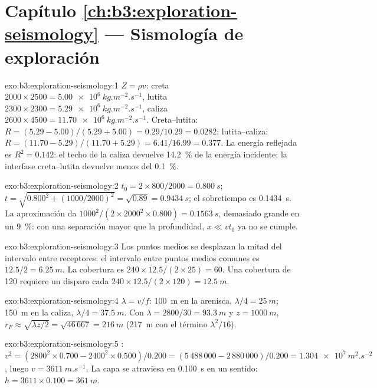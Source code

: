 \section*{Capítulo \ref{ch:b3:exploration-seismology} --- Sismología de exploración}

\begin{solution}{exo:b3:exploration-seismology:1}
$Z = \rho v$: creta $2000\times2500 = \qty{5.00e6}{kg.m^{-2}.s^{-1}}$, lutita
$2300\times2300 = \qty{5.29e6}{kg.m^{-2}.s^{-1}}$, caliza $2600\times4500 =
\qty{11.70e6}{kg.m^{-2}.s^{-1}}$. Creta--lutita: $R = (5.29 - 5.00)/(5.29 + 5.00)
= 0.29/10.29 = 0.0282$; lutita--caliza: $R = (11.70 - 5.29)/(11.70 + 5.29) =
6.41/16.99 = 0.377$. La energía reflejada es $R^2 = 0.142$: el techo de la
caliza devuelve \qty{14.2}{\percent} de la energía incidente; la interfase creta--lutita
devuelve menos del \qty{0.1}{\percent}.
\end{solution}

\begin{solution}{exo:b3:exploration-seismology:2}
$t_0 = 2\times800/2000 = \qty{0.800}{s}$; $t = \sqrt{0.800^2 + (1000/2000)^2} =
\sqrt{0.89} = \qty{0.9434}{s}$; el sobretiempo es \qty{0.1434}{s}. La
aproximación da $1000^2/(2\times2000^2\times0.800) = \qty{0.1563}{s}$, demasiado
grande en un \qty{9}{\percent}: con una separación mayor que la profundidad, $x \ll vt_0$ ya no
se cumple.
\end{solution}

\begin{solution}{exo:b3:exploration-seismology:3}
Los puntos medios se desplazan la mitad del intervalo entre receptores: el intervalo entre puntos medios comunes es
$12.5/2 = \qty{6.25}{m}$. La cobertura es $240\times12.5/(2\times25) = 60$. Una cobertura de
120 requiere un disparo cada $240\times12.5/(2\times120) = \qty{12.5}{m}$.
\end{solution}

\begin{solution}{exo:b3:exploration-seismology:4}
$\lambda = v/f$: \qty{100}{m} en la arenisca, $\lambda/4 = \qty{25}{m}$;
\qty{150}{m} en la caliza, $\lambda/4 = \qty{37.5}{m}$. Con
$\lambda = 2800/30 = \qty{93.3}{m}$ y $z = \qty{1000}{m}$,
$r_F \approx \sqrt{\lambda z/2} = \sqrt{46\,667} = \qty{216}{m}$ (\qty{217}{m}
con el término $\lambda^2/16$).
\end{solution}

\begin{solution}{exo:b3:exploration-seismology:5}
: $v^2 = (2800^2\times0.700 - 2400^2\times0.500)/0.200 = (5\,488\,000 -
2\,880\,000)/0.200 = \qty{1.304e7}{m^2.s^{-2}}$, luego $v = \qty{3611}{m.s^{-1}}$.
La capa se atraviesa en \qty{0.100}{s} en un sentido: $h = 3611\times0.100 =
\qty{361}{m}$.
\end{solution}

